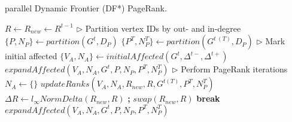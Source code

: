 \begin{algorithm}[!hbt]
\caption{ parallel Dynamic Frontier (DF*) PageRank.}
\label{alg:frontier}
\begin{algorithmic}[1]

\Statex

  \State $R \gets R_{new} \gets R^{t-1}$ \label{alg:frontier--initialize}
  \State $\rhd$ Partition vertex IDs by out- and in-degree 
  \State $\{P, N_P\} \gets partition(G^t, D_P)$
  \State $\{P^T, N^T_P\} \gets partition(G^{t\ (T)}, D_P)$
  \State $\rhd$ Mark initial affected
  \State $\{V_A, N_A\} \gets initialAffected(G^t, \Delta^{t-}, \Delta^{t+})$
  \State $expandAffected(V_A, N_A, G^t, P, N_P, P^T, N^T_P)$
  \State $\rhd$ Perform PageRank iterations
  \ForAll{$i \in [0 .. MAX\_ITERATIONS)$} \label{alg:frontier--compute-begin}
    \State $N_A \gets \{\}$
    \State $updateRanks(V_A, N_A, R_{new}, R, G^{t (T)}, P^T, N^T_P)$
    \State $\Delta R \gets l_{\infty}NormDelta(R_{new}, R)$ \textbf{;} $swap(R_{new}, R)$
     \textbf{break}
    \EndIf
    \State $expandAffected(V_A, N_A, G^t, P, N_P, P^T, N^T_P)$
  \EndFor \label{alg:frontier--compute-end}
  \State {} \label{alg:frontier--return}
\EndFunction
\end{algorithmic}
\end{algorithm}





